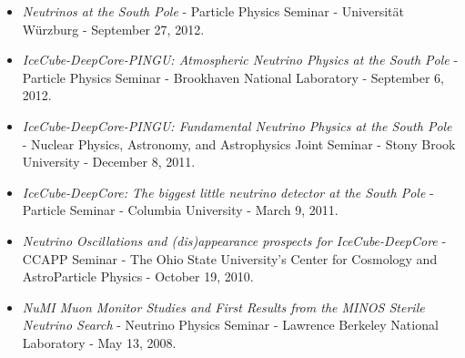 \documentclass[a4paper,11pt]{article}
\begin{document}
\begin{multicols}{2}
\begin{itemize}[topsep=0pt,itemsep=4.5pt,partopsep=0pt,parsep=0pt]
{Lunchtime Seminar - Massachusetts Institute of Technology - December 11, 2012.}
%
\item{ \textit{Neutrinos at the South Pole} - 
Particle Physics Seminar - Universit\"{a}t W\"{u}rzburg - September 27, 2012.}
%
\item{ \textit{IceCube-DeepCore-PINGU: Atmospheric Neutrino Physics at the South Pole} - 
Particle Physics Seminar - Brookhaven National Laboratory - September 6, 2012.}
%
%
\item{ \textit{IceCube-DeepCore-PINGU: Fundamental Neutrino Physics at the South Pole} - 
Nuclear Physics, Astronomy, and Astrophysics Joint Seminar - Stony Brook University - December 8, 2011.}
%
%
\item{ \textit{IceCube-DeepCore: The biggest little neutrino detector at the South Pole} - 
Particle Seminar - Columbia University - March 9, 2011.}
%
\item{ \textit{Neutrino Oscillations and (dis)appearance prospects for IceCube-DeepCore} - 
CCAPP Seminar - The Ohio State University's Center for Cosmology and AstroParticle Physics - October 19, 2010.}
%
\item{ \textit{NuMI Muon Monitor Studies and First Results from the MINOS Sterile Neutrino Search} - 
Neutrino Physics Seminar - Lawrence Berkeley National Laboratory - May 13,  2008.}
\end{itemize}
\end{multicols}
\end{document}

